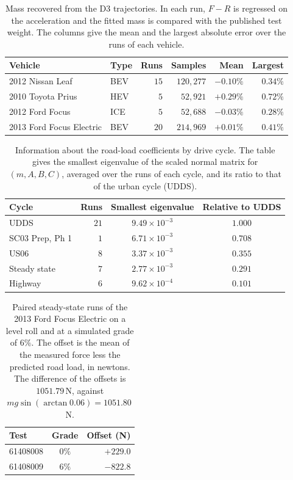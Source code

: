 \begin{table}[htbp]
\centering\small
\caption{Mass recovered from the D3 trajectories. In each run, $F-R$ is regressed on the acceleration and the fitted mass is compared with the published test weight. The columns give the mean and the largest absolute error over the runs of each vehicle.}\label{tab:app-d3mass}
\begin{tabular}{llrrrr}
\toprule
Vehicle & Type & Runs & Samples & Mean & Largest\\
\midrule
2012 Nissan Leaf & BEV & $15$ & $120{,}277$ & $-0.10\%$ & $0.34\%$\\
2010 Toyota Prius & HEV & $5$ & $52{,}921$ & $+0.29\%$ & $0.72\%$\\
2012 Ford Focus & ICE & $5$ & $52{,}688$ & $-0.03\%$ & $0.28\%$\\
2013 Ford Focus Electric & BEV & $20$ & $214{,}969$ & $+0.01\%$ & $0.41\%$\\
\bottomrule
\end{tabular}
\end{table}

\begin{table}[htbp]
\centering\small
\caption{Information about the road-load coefficients by drive cycle. The table gives the smallest eigenvalue of the scaled normal matrix for $(m,A,B,C)$, averaged over the runs of each cycle, and its ratio to that of the urban cycle (UDDS).}\label{tab:app-d3cycle}
\begin{tabular}{lrcc}
\toprule
Cycle & Runs & Smallest eigenvalue & Relative to UDDS\\
\midrule
UDDS & $21$ & $9.49\times10^{-3}$ & $1.000$\\
SC03 Prep, Ph 1 & $1$ & $6.71\times10^{-3}$ & $0.708$\\
US06 & $8$ & $3.37\times10^{-3}$ & $0.355$\\
Steady state & $7$ & $2.77\times10^{-3}$ & $0.291$\\
Highway & $6$ & $9.62\times10^{-4}$ & $0.101$\\
\bottomrule
\end{tabular}
\end{table}

\begin{table}[htbp]
\centering\small
\caption{Paired steady-state runs of the 2013 Ford Focus Electric on a level roll and at a simulated grade of $6\%$. The offset is the mean of the measured force less the predicted road load, in newtons. The difference of the offsets is $1051.79$\,N, against $mg\sin(\arctan0.06)=1051.80$\,N.}\label{tab:app-grade}
\begin{tabular}{lcr}
\toprule
Test & Grade & Offset (N)\\
\midrule
61408008 & $0\%$ & $+229.0$\\
61408009 & $6\%$ & $-822.8$\\
\bottomrule
\end{tabular}
\end{table}

